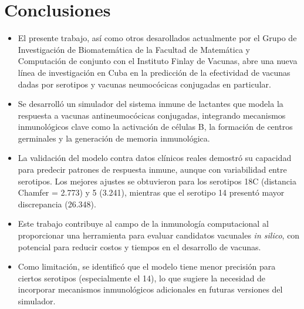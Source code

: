 \chapter*{Conclusiones}\label{chapter:conclusions}

\begin{itemize}
    \item El presente trabajo, así como otros desarollados actualmente por el Grupo de Investigación de Biomatemática de la Facultad de Matemática y Computación de conjunto con el Instituto Finlay de Vacunas, abre una nueva línea de investigación en Cuba en la predicción de la efectividad de vacunas dadas por serotipos y vacunas neumocócicas conjugadas en particular.

    \item Se desarrolló un simulador  del sistema inmune de lactantes que modela la respuesta a vacunas antineumocócicas conjugadas, integrando mecanismos inmunológicos clave como la activación de células B, la formación de centros germinales y la generación de memoria inmunológica.

    \item La validación del modelo contra datos clínicos reales demostró su capacidad para predecir patrones de respuesta inmune, aunque con variabilidad entre serotipos. Los mejores ajustes se obtuvieron para los serotipos 18C (distancia Chamfer = 2.773) y 5 (3.241), mientras que el serotipo 14 presentó mayor discrepancia (26.348).

    \item Este trabajo contribuye al campo de la inmunología computacional al proporcionar una herramienta para evaluar candidatos vacunales \textit{in silico}, con potencial para reducir costos y tiempos en el desarrollo de vacunas. 

    \item Como limitación, se identificó que el modelo tiene menor precisión para ciertos serotipos (especialmente el 14), lo que sugiere la necesidad de incorporar mecanismos inmunológicos adicionales en futuras versiones del simulador.
\end{itemize}

